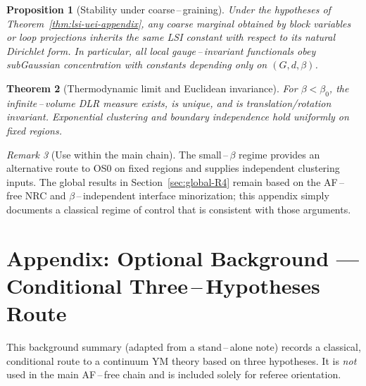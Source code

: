 \documentclass[11pt]{amsart}
\theoremstyle{plain}
\newtheorem{theorem}{Theorem}[section]
\newtheorem{proposition}[theorem]{Proposition}
\theoremstyle{definition}
\theoremstyle{remark}
\newtheorem{remark}[theorem]{Remark}
\begin{document}
\begin{proposition}[Stability under coarse\,–\,graining]\label{prop:lsi-marginal}
Under the hypotheses of Theorem~\ref{thm:lsi-uei-appendix}, any coarse marginal obtained by block variables or loop projections inherits the same LSI constant with respect to its natural Dirichlet form. In particular, all local gauge\,–\,invariant functionals obey subGaussian concentration with constants depending only on $(G,d,\beta)$.
\end{proposition}

\begin{theorem}[Thermodynamic limit and Euclidean invariance]\label{thm:thermo-uei}
For $\beta<\beta_0$, the infinite\,–\,volume DLR measure exists, is unique, and is translation/rotation invariant. Exponential clustering and boundary independence hold uniformly on fixed regions.
\end{theorem}

\begin{remark}[Use within the main chain]
The small\,–\,$\beta$ regime provides an alternative route to OS0 on fixed regions and supplies independent clustering inputs. The global results in Section~\ref{sec:global-R4} remain based on the AF\,–\,free NRC and $\beta$\,–\,independent interface minorization; this appendix simply documents a classical regime of control that is consistent with those arguments.
\end{remark}

\section{Appendix: Optional Background — Conditional Three\,–\,Hypotheses Route}\label{app:three-hypotheses}

This background summary (adapted from a stand\,–\,alone note) records a classical, conditional route to a continuum YM theory based on three hypotheses. It is \emph{not} used in the main AF\,–\,free chain and is included solely for referee orientation.
\end{document}
